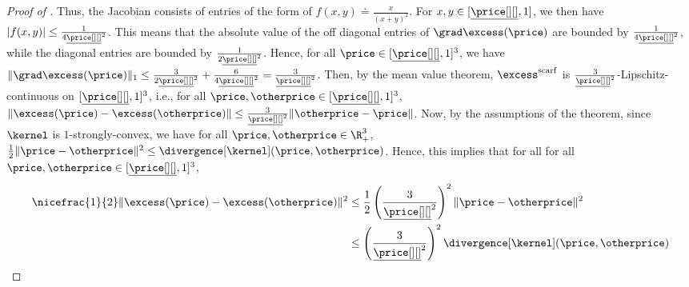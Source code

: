 \begin{proof}[Proof of ]
    Thus, the Jacobian consists of entries of the form of $f(x,y) \doteq \frac{x}{(x+y)^2}$. For $x, y \in [\underline{\price[ ][]}, 1]$, we then have $|f(x,y)| \leq \frac{1}{4 \underline{\price[ ][]}^2}$. This means that the absolute value of the off diagonal entries of $\grad \excess(\price)$ are bounded by $\frac{1}{4 \underline{\price[ ][]}^2}$, while the diagonal entries are bounded by $\frac{1}{2\underline{\price[ ][]}^2}$. Hence, for all $\price \in [\underline{\price[ ][]}, 1]^3$, we have $\|\grad \excess(\price)\|_1 \leq \frac{3}{2\underline{\price[ ][]}^2} + \frac{6}{4 \underline{\price[ ][]}^2} = \frac{3}{\underline{\price[ ][]}^2}$. Then, by the mean value theorem, $\excess^{\mathrm{scarf}}$ is $\frac{3}{\underline{\price[ ][]}^2}$-Lipschitz-continuous on $[\underline{\price[ ][]}, 1]^3$, i.e., for all $\price, \otherprice \in [\underline{\price[ ][]}, 1]^3$, $\|\excess(\price) - \excess(\otherprice)\| \leq \frac{3}{\underline{\price[ ][]}^2} \| \otherprice - \price \|$. Now, by the assumptions of the theorem, since $\kernel$ is $1$-strongly-convex, we have for all $\price, \otherprice \in \R^3_+$, $\frac{1}{2}\|\price - \otherprice \|^2 \leq \divergence[\kernel](\price, \otherprice)$. Hence, this implies that for all for all $\price, \otherprice \in [\underline{\price[ ][]}, 1]^3$, 
    \begin{align*}
        \nicefrac{1}{2}\|\excess(\price) - \excess(\otherprice)\|^2 &\leq \frac{1}{2} \left(\frac{3}{\underline{\price[ ][]}^2} \right)^2   \| \price - \otherprice \|^2\\ 
        &\leq \left(\frac{3}{\underline{\price[ ][]}^2} \right)^2 \divergence[\kernel](\price, \otherprice)
    \end{align*}
\end{proof}